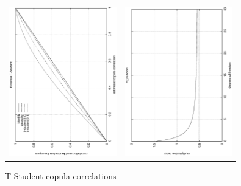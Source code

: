 \documentclass[a4paper,12pt,final]{article}
\begin{document}

\begin{figure}[!hbt]
\begin{center}
\begin{tabular}{cc}
\includegraphics[height=6.5cm, angle=-90]{./images/btsf.eps} &
\includegraphics[height=6.5cm, angle=-90]{./images/btsh.eps} \\
\end{tabular}
\caption{T-Student copula correlations}
\label{img:t-student-correlations}
\end{center}
\end{figure}
\end{document}
